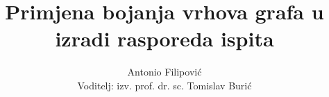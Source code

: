 \documentclass[times, utf8, zavrsni, numeric]{fer}
\begin{document}

\title{Primjena bojanja vrhova grafa u izradi rasporeda ispita}

\author{Antonio Filipović\\
Voditelj: izv. prof. dr. sc. Tomislav Burić}

\maketitle




\tableofcontents
\end{document}
